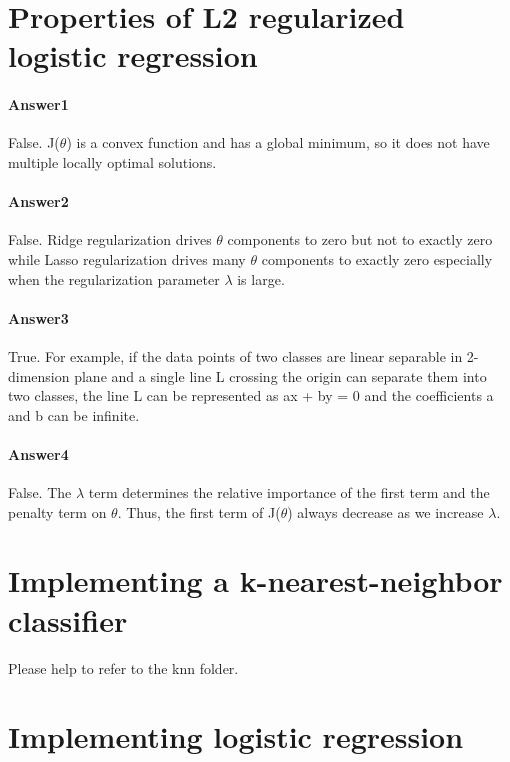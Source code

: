 \documentclass[paper=a4, fontsize=11pt]{scrartcl} %
\numberwithin{equation}{section} %
\numberwithin{figure}{section} %
\numberwithin{table}{section} %
\begin{document}
\section{Properties of L2 regularized logistic regression}
\paragraph{\textbf{Answer1}}False. J($\theta$) is a convex function and has a global minimum, so it does not have multiple locally optimal solutions.

\paragraph{\textbf{Answer2}}False. Ridge regularization drives $\theta$ components to zero but not to exactly zero while Lasso regularization drives many $\theta$ components to exactly zero especially when the regularization parameter $\lambda$ is large.

\paragraph{\textbf{Answer3}}True. For example, if the data points of two classes are linear separable in 2-dimension plane and a single line L crossing the origin can separate them into two classes, the line L can be represented as ax + by = 0 and the coefficients a and b can be infinite.

\paragraph{\textbf{Answer4}}False. The $\lambda$ term determines the relative importance of the first term and the penalty term on $\theta$. Thus, the first term of J($\theta$) always decrease as we increase $\lambda$.

\section{Implementing a k-nearest-neighbor classifier} Please help to refer to the knn folder.



\section{Implementing logistic regression}
\end{document}
